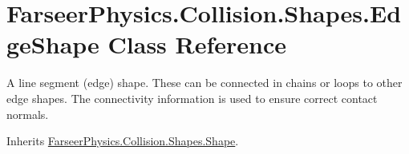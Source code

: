 \hypertarget{class_farseer_physics_1_1_collision_1_1_shapes_1_1_edge_shape}{\section{Farseer\+Physics.\+Collision.\+Shapes.\+Edge\+Shape Class Reference}
\label{class_farseer_physics_1_1_collision_1_1_shapes_1_1_edge_shape}
}


A line segment (edge) shape. These can be connected in chains or loops to other edge shapes. The connectivity information is used to ensure correct contact normals.  




Inherits \hyperlink{class_farseer_physics_1_1_collision_1_1_shapes_1_1_shape}{Farseer\+Physics.\+Collision.\+Shapes.\+Shape}.

